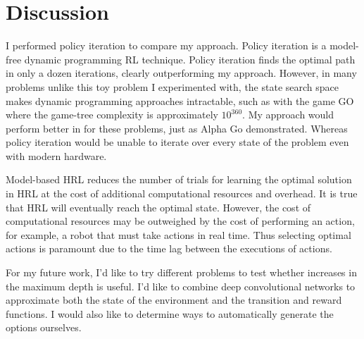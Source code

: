 \section{Discussion}
I performed policy iteration to compare my approach. Policy iteration is a model-free dynamic programming RL technique. Policy iteration finds the optimal path in only a dozen iterations, clearly outperforming my approach. However, in many problems unlike this toy problem I experimented with, the state search space makes dynamic programming approaches intractable, such as with the game GO where the game-tree complexity is approximately $10^{360}$. My approach would perform better in for these problems, just as Alpha Go demonstrated. Whereas policy iteration would be unable to iterate over every state of the problem even with modern hardware.

Model-based HRL reduces the number of trials for learning the optimal solution in HRL at the cost of additional computational resources and overhead. It is true that HRL will eventually reach the optimal state. However, the cost of computational resources may be outweighed by the cost of performing an action, for example, a robot that must take actions in real time. Thus selecting optimal actions is paramount due to the time lag between the executions of actions.

For my future work, I'd like to try different problems to test whether increases in the maximum depth is useful. I'd like to combine deep convolutional networks to approximate both the state of the environment and the transition and reward functions. I would also like to determine ways to automatically generate the options ourselves.
